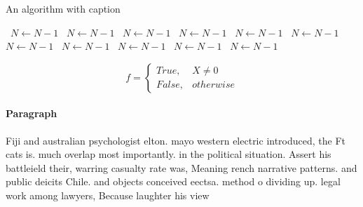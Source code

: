 \documentclass[a4paper]{article}
\begin{document}
\begin{algorithm}
\caption{An algorithm with caption}
\begin{algorithmic}
\    \State $N \gets N - 1$
\    \State $N \gets N - 1$
\    \State $N \gets N - 1$
\    \State $N \gets N - 1$
\    \State $N \gets N - 1$
\    \State $N \gets N - 1$
\    \State $N \gets N - 1$
\    \State $N \gets N - 1$
\    \State $N \gets N - 1$
\    \State $N \gets N - 1$
\    \State $N \gets N - 1$
\EndWhile
\end{algorithmic}
\end{algorithm}

\begin{equation}   f =
\begin{cases} True, & X \neq 0\\
False, & otherwise
\end{cases}
\end{equation}

\paragraph{Paragraph}
Fiji and australian psychologist elton. mayo western electric introduced, the Ft cats is. much overlap most importantly. in the political situation. Assert his battleield their, warring casualty rate was, Meaning rench narrative patterns. and public deicits Chile. and objects conceived eectsa. method o dividing up. legal work among lawyers, Because laughter his view 
\end{document}
